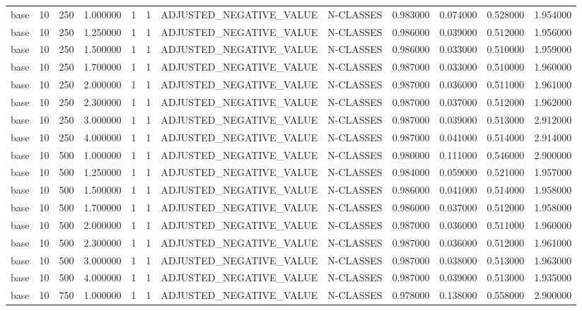 \begin{tabular}{lrrrllllrrrr}
base & 10 & 250 & 1.000000 & 1 & 1 & ADJUSTED_NEGATIVE_VALUE & N-CLASSES & 0.983000 & 0.074000 & 0.528000 & 1.954000 \\
base & 10 & 250 & 1.250000 & 1 & 1 & ADJUSTED_NEGATIVE_VALUE & N-CLASSES & 0.986000 & 0.039000 & 0.512000 & 1.956000 \\
base & 10 & 250 & 1.500000 & 1 & 1 & ADJUSTED_NEGATIVE_VALUE & N-CLASSES & 0.986000 & 0.033000 & 0.510000 & 1.959000 \\
base & 10 & 250 & 1.700000 & 1 & 1 & ADJUSTED_NEGATIVE_VALUE & N-CLASSES & 0.987000 & 0.033000 & 0.510000 & 1.960000 \\
base & 10 & 250 & 2.000000 & 1 & 1 & ADJUSTED_NEGATIVE_VALUE & N-CLASSES & 0.987000 & 0.036000 & 0.511000 & 1.961000 \\
base & 10 & 250 & 2.300000 & 1 & 1 & ADJUSTED_NEGATIVE_VALUE & N-CLASSES & 0.987000 & 0.037000 & 0.512000 & 1.962000 \\
base & 10 & 250 & 3.000000 & 1 & 1 & ADJUSTED_NEGATIVE_VALUE & N-CLASSES & 0.987000 & 0.039000 & 0.513000 & 2.912000 \\
base & 10 & 250 & 4.000000 & 1 & 1 & ADJUSTED_NEGATIVE_VALUE & N-CLASSES & 0.987000 & 0.041000 & 0.514000 & 2.914000 \\
base & 10 & 500 & 1.000000 & 1 & 1 & ADJUSTED_NEGATIVE_VALUE & N-CLASSES & 0.980000 & 0.111000 & 0.546000 & 2.900000 \\
base & 10 & 500 & 1.250000 & 1 & 1 & ADJUSTED_NEGATIVE_VALUE & N-CLASSES & 0.984000 & 0.059000 & 0.521000 & 1.957000 \\
base & 10 & 500 & 1.500000 & 1 & 1 & ADJUSTED_NEGATIVE_VALUE & N-CLASSES & 0.986000 & 0.041000 & 0.514000 & 1.958000 \\
base & 10 & 500 & 1.700000 & 1 & 1 & ADJUSTED_NEGATIVE_VALUE & N-CLASSES & 0.986000 & 0.037000 & 0.512000 & 1.958000 \\
base & 10 & 500 & 2.000000 & 1 & 1 & ADJUSTED_NEGATIVE_VALUE & N-CLASSES & 0.987000 & 0.036000 & 0.511000 & 1.960000 \\
base & 10 & 500 & 2.300000 & 1 & 1 & ADJUSTED_NEGATIVE_VALUE & N-CLASSES & 0.987000 & 0.036000 & 0.512000 & 1.961000 \\
base & 10 & 500 & 3.000000 & 1 & 1 & ADJUSTED_NEGATIVE_VALUE & N-CLASSES & 0.987000 & 0.038000 & 0.513000 & 1.963000 \\
base & 10 & 500 & 4.000000 & 1 & 1 & ADJUSTED_NEGATIVE_VALUE & N-CLASSES & 0.987000 & 0.039000 & 0.513000 & 1.935000 \\
base & 10 & 750 & 1.000000 & 1 & 1 & ADJUSTED_NEGATIVE_VALUE & N-CLASSES & 0.978000 & 0.138000 & 0.558000 & 2.900000 \\

\end{tabular}
